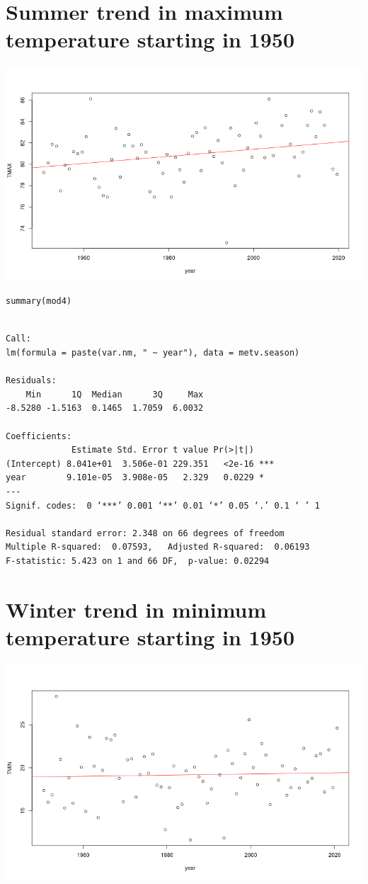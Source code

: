 \documentclass[11pt]{article}
\begin{document}
\section{Summer trend in maximum temperature starting in 1950}
\label{sec:org0427e6f}
\begin{center}
\includegraphics[width=.9\linewidth]{summer_tmax_1950.png}
\end{center}


\begin{verbatim}
summary(mod4)
\end{verbatim}

\begin{verbatim}

Call:
lm(formula = paste(var.nm, " ~ year"), data = metv.season)

Residuals:
    Min      1Q  Median      3Q     Max 
-8.5280 -1.5163  0.1465  1.7059  6.0032 

Coefficients:
             Estimate Std. Error t value Pr(>|t|)    
(Intercept) 8.041e+01  3.506e-01 229.351   <2e-16 ***
year        9.101e-05  3.908e-05   2.329   0.0229 *  
---
Signif. codes:  0 ‘***’ 0.001 ‘**’ 0.01 ‘*’ 0.05 ‘.’ 0.1 ‘ ’ 1

Residual standard error: 2.348 on 66 degrees of freedom
Multiple R-squared:  0.07593,	Adjusted R-squared:  0.06193 
F-statistic: 5.423 on 1 and 66 DF,  p-value: 0.02294
\end{verbatim}

\section{Winter trend in minimum temperature starting in 1950}
\label{sec:org9cc9ccd}

\begin{center}
\includegraphics[width=.9\linewidth]{winter_tmin_1950.png}
\end{center}
\end{document}
